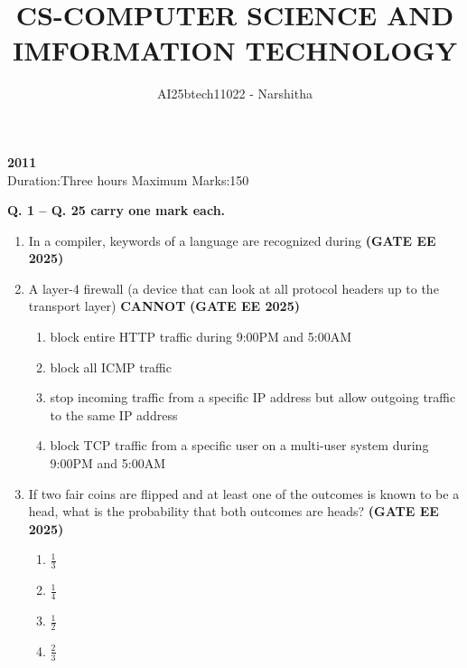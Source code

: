 \documentclass[journal,12pt,onecolumn]{IEEEtran}
\theoremstyle{remark}
\begin{document}
\title{CS-COMPUTER SCIENCE AND IMFORMATION TECHNOLOGY}
\author{AI25btech11022 - Narshitha}
\maketitle
\renewcommand{\thefigure}{\theenumi}
\renewcommand{\thetable}{\theenumi}
\begin {center}
\large \textbf{2011}\\


{Duration:Three hours \hfill Maximum Marks:150}
\end{center}



\begin{center}
\textbf{Q. 1 -- Q. 25 carry one mark each.}
\end{center}
\begin{enumerate}
\item In a compiler, keywords of a language are recognized during
\hfill \textbf{(GATE EE 2025)}
\begin{enumerate}
\end{enumerate}

\item A layer-4 firewall (a device that can look at all protocol headers up to the transport layer) \textbf{CANNOT}
\hfill \textbf{(GATE EE 2025)}
\begin{enumerate}
    \item block entire HTTP traffic during 9:00PM and 5:00AM
    \item block all ICMP traffic
    \item stop incoming traffic from a specific IP address but allow outgoing traffic to the same IP address
    \item block TCP traffic from a specific user on a multi-user system during 9:00PM and 5:00AM
\end{enumerate}

\item If two fair coins are flipped and at least one of the outcomes is known to be a head, what is the probability that both outcomes are heads?
\hfill \textbf{(GATE EE 2025)}
\begin{enumerate}
    \item $\frac{1}{3}$
    \item $\frac{1}{4}$
    \item $\frac{1}{2}$
    \item $\frac{2}{3}$
\end{enumerate}


\end{enumerate}
\end{document}

